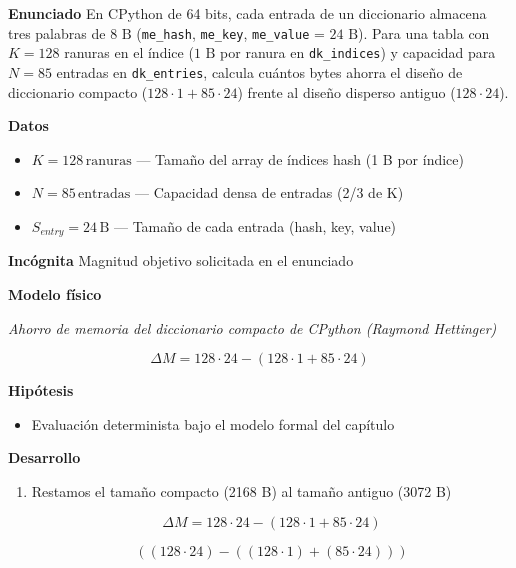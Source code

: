 \documentclass{book}
\begin{document}
\begin{tcolorbox}[title={Problema resuelto}, studiumworked, breakable]

\noindent\textbf{Enunciado}
En CPython de 64 bits, cada entrada de un diccionario almacena tres palabras de \(8\text{ B}\) (\texttt{me\_hash}, \texttt{me\_key}, \texttt{me\_value} = \(24\text{ B}\)). Para una tabla con \(K = 128\) ranuras en el índice (\(1\text{ B}\) por ranura en \texttt{dk\_indices}) y capacidad para \(N = 85\) entradas en \texttt{dk\_entries}, calcula cuántos bytes ahorra el diseño de diccionario compacto (\(128 \cdot 1 + 85 \cdot 24\)) frente al diseño disperso antiguo (\(128 \cdot 24\)).

\noindent\textbf{Datos}
\begin{itemize}
\item $K = 128\,\mathrm{ranuras}$ — Tamaño del array de índices hash (1 B por índice)
\item $N = 85\,\mathrm{entradas}$ — Capacidad densa de entradas (2/3 de K)
\item $S_{entry} = 24\,\mathrm{B}$ — Tamaño de cada entrada (hash, key, value)
\end{itemize}

\noindent\textbf{Incógnita}
Magnitud objetivo solicitada en el enunciado

\noindent\textbf{Modelo físico}

\noindent\textit{Ahorro de memoria del diccionario compacto de CPython (Raymond Hettinger)}

\[
\Delta M = 128 \cdot 24 - (128 \cdot 1 + 85 \cdot 24)
\]

\noindent\textbf{Hipótesis}
\begin{itemize}
\item Evaluación determinista bajo el modelo formal del capítulo
\end{itemize}

\noindent\textbf{Desarrollo}
\begin{enumerate}
\item
Restamos el tamaño compacto (2168 B) al tamaño antiguo (3072 B)

\[
\Delta M = 128 \cdot 24 - (128 \cdot 1 + 85 \cdot 24)
\]

\[
\left(\left(128\cdot 24\right)-\left(\left(128\cdot 1\right)+\left(85\cdot 24\right)\right)\right)
\]
\end{enumerate}


\end{tcolorbox}
\end{document}
